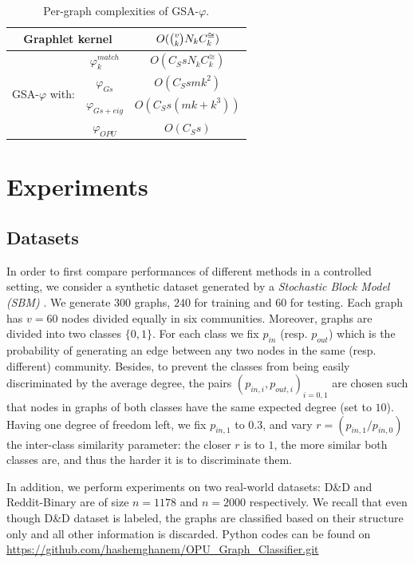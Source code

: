 \documentclass{article}
\begin{document}
\begin{table}
\centering
\begin{tabular}{|c|c|c|}
\hline
\multicolumn{2}{|c|}{Graphlet kernel} & $O(\tbinom{v}{k} N_k C^{\cong}_k)$\\ \hline \hline
%
\multirow{4}{*}{GSA-$\varphi$ with:} & $\varphi^{match}_k$ & $O(C_S s N_k C^{\cong}_k)$ \\
& $\varphi_{Gs}$ & $O(C_S s m k^2)$ \\ 
& $\varphi_{Gs+eig}$  & $O(C_S s (m k + k^3))$ \\ 
& $\varphi_{OPU}$  & $O(C_S s)$ \\ \hline
\end{tabular}
\caption{Per-graph complexities of GSA-$\varphi$.}
\label{tab:cost}
\end{table}


\section{Experiments}\label{sec:experiments}
\subsection{Datasets}\label{sec:setup}
%
In order to first compare performances of different methods in a controlled setting, we consider a synthetic dataset generated by a \emph{Stochastic Block Model (SBM)} \cite{SBM}. We generate $300$ graphs, $240$ for training  and $60$ for testing. Each graph has $v=60$ nodes divided equally in six communities. Moreover, graphs are divided into two classes $\{0 , 1\}$. For each class we fix $p_{in}$ (resp. $p_{out}$) which is the probability of generating an edge between any two nodes in the same (resp. different) community. Besides, to prevent the classes from being easily discriminated by the average degree, the pairs $(p_{in,i} , p_{out,i})_{i=0,1}$ are chosen such that nodes in graphs of both classes have the same expected degree (set to $10$). Having one degree of freedom left, we fix $p_{in,1}$ to $0.3$, and vary $r=(p_{in,1}/p_{in,0})$ the inter-class similarity parameter: the closer $r$ is to $1$, the more similar both classes are, and thus the harder it is to discriminate them.

In addition, we perform experiments on two real-world datasets: D\&D \cite{DD_ref} and Reddit-Binary \cite{class_Reddit} are of size $n=1178$ and  $n=2000$ respectively. We recall that even though D\&D dataset is labeled, the graphs are classified based on their structure only and all other information is discarded. Python codes can be found on \url{https://github.com/hashemghanem/OPU_Graph_Classifier.git}
\end{document}
